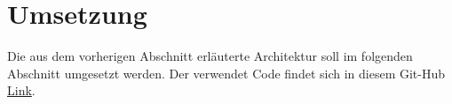 
\chapter{Umsetzung}
Die aus dem vorherigen Abschnitt erläuterte Architektur soll im folgenden Abschnitt umgesetzt werden. Der verwendet Code findet sich in diesem Git-Hub \href{https://github.com/Juli-03/DB2_Redis.git}{Link}.